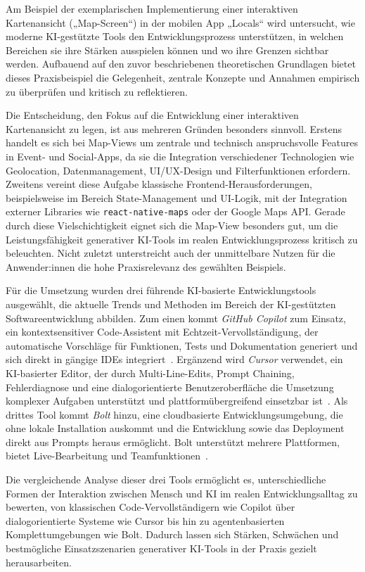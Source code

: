 \label{sec:zielsetzung-vorgehen}

Am Beispiel der exemplarischen Implementierung einer interaktiven Kartenansicht
(„Map-Screen“) in der mobilen App „Locals“ wird untersucht, wie moderne
KI-gestützte Tools den Entwicklungsprozess unterstützen, in welchen Bereichen
sie ihre Stärken ausspielen können und wo ihre Grenzen sichtbar werden.
Aufbauend auf den zuvor beschriebenen theoretischen Grundlagen bietet dieses
Praxisbeispiel die Gelegenheit, zentrale Konzepte und Annahmen empirisch zu
überprüfen und kritisch zu reflektieren.

Die Entscheidung, den Fokus auf die Entwicklung einer interaktiven
Kartenansicht zu legen, ist aus mehreren Gründen besonders sinnvoll. Erstens
handelt es sich bei Map-Views um zentrale und technisch anspruchsvolle Features
in Event- und Social-Apps, da sie die Integration verschiedener Technologien
wie Geolocation, Datenmanagement, UI/UX-Design und Filterfunktionen erfordern.
Zweitens vereint diese Aufgabe klassische Frontend-Herausforderungen,
beispielsweise im Bereich State-Management und UI-Logik, mit der Integration
externer Libraries wie \texttt{react-native-maps} oder der Google Maps API.
Gerade durch diese Vielschichtigkeit eignet sich die Map-View besonders gut, um
die Leistungsfähigkeit generativer KI-Tools im realen Entwicklungsprozess
kritisch zu beleuchten. Nicht zuletzt unterstreicht auch der unmittelbare
Nutzen für die Anwender:innen die hohe Praxisrelevanz des gewählten Beispiels.

Für die Umsetzung wurden drei führende KI-basierte Entwicklungstools
ausgewählt, die aktuelle Trends und Methoden im Bereich der KI-gestützten
Softwareentwicklung abbilden. Zum einen kommt \textit{GitHub Copilot} zum
Einsatz, ein kontextsensitiver Code-Assistent mit Echtzeit-Vervollständigung,
der automatische Vorschläge für Funktionen, Tests und Dokumentation generiert
und sich direkt in gängige IDEs integriert~\cite{github_copilot_2025}.
Ergänzend wird \textit{Cursor} verwendet, ein KI-basierter Editor, der durch
Multi-Line-Edits, Prompt Chaining, Fehlerdiagnose und eine dialogorientierte
Benutzeroberfläche die Umsetzung komplexer Aufgaben unterstützt und
plattformübergreifend einsetzbar ist~\cite{cursor_welcome_2025}. Als drittes
Tool kommt \textit{Bolt} hinzu, eine cloudbasierte Entwicklungsumgebung, die
ohne lokale Installation auskommt und die Entwicklung sowie das Deployment
direkt aus Prompts heraus ermöglicht. Bolt unterstützt mehrere Plattformen,
bietet Live-Bearbeitung und Teamfunktionen~\cite{bolt_support_2025}.

Die vergleichende Analyse dieser drei Tools ermöglicht es, unterschiedliche
Formen der Interaktion zwischen Mensch und KI im realen Entwicklungsalltag zu
bewerten, von klassischen Code-Vervollständigern wie Copilot über
dialogorientierte Systeme wie Cursor bis hin zu agentenbasierten
Komplettumgebungen wie Bolt. Dadurch lassen sich Stärken, Schwächen und
bestmögliche Einsatzszenarien generativer KI-Tools in der Praxis gezielt
herausarbeiten.
